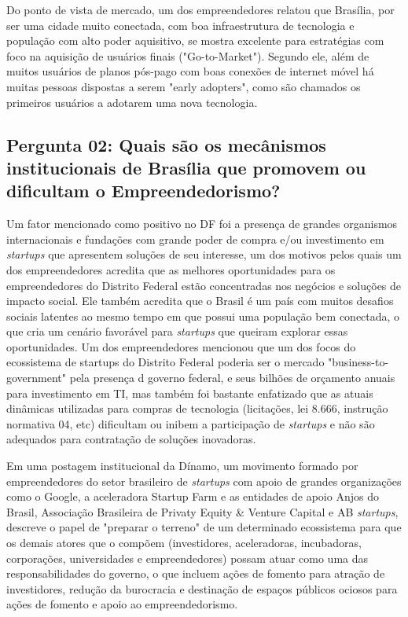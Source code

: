 Do ponto de vista de mercado, um dos empreendedores relatou que Brasília, por ser uma cidade muito conectada, com boa infraestrutura de tecnologia e população com alto poder aquisitivo, se mostra excelente para estratégias com foco na aquisição de usuários finais ("Go-to-Market"). Segundo ele, além de muitos usuários de planos pós-pago com boas conexões de internet móvel há muitas pessoas dispostas a serem "early adopters", como são chamados os primeiros usuários a adotarem uma nova tecnologia.

\subsection*{Pergunta 02: Quais são os mecânismos institucionais de Brasília que promovem ou dificultam o Empreendedorismo?}
\label{subsection:pergunta_de_pesquisa_2}

Um fator mencionado como positivo no DF foi a presença de grandes organismos internacionais e fundações com grande poder de compra e/ou investimento em \textit{startups} que apresentem soluções de seu interesse, um dos motivos pelos quais um dos empreendedores acredita que as melhores oportunidades para os empreendedores do Distrito Federal estão concentradas nos negócios e soluções de impacto social. Ele também acredita que o Brasil é um país com muitos desafios sociais latentes ao mesmo tempo em que possui uma população bem conectada, o que cria um cenário favorável para \textit{startups} que queiram explorar essas oportunidades. Um dos empreendedores mencionou que um dos focos do ecossistema de startups do Distrito Federal poderia ser o mercado "business-to-government" pela presença d governo federal, e seus bilhões de orçamento anuais para investimento em TI, mas também foi bastante enfatizado que as atuais dinâmicas utilizadas para compras de tecnologia (licitações, lei 8.666, instrução normativa 04, etc) dificultam ou inibem a participação de \textit{startups} e não são adequados para contratação de soluções inovadoras. 

Em uma postagem institucional da Dínamo, um movimento formado por empreendedores do setor brasileiro de \textit{startups} com apoio de grandes organizações como o Google, a aceleradora Startup Farm e as entidades de apoio Anjos do Brasil, Associação Brasileira de Privaty Equity \& Venture Capital e AB \textit{startups},  descreve o papel de "preparar o terreno" de um determinado ecossistema para que os demais atores que o compõem (investidores, aceleradoras, incubadoras, corporações, universidades e empreendedores) possam atuar como uma das responsabilidades do governo, o que incluem ações de fomento para atração de investidores, redução da burocracia e destinação de espaços públicos ociosos para ações de fomento e apoio ao empreendedorismo.

